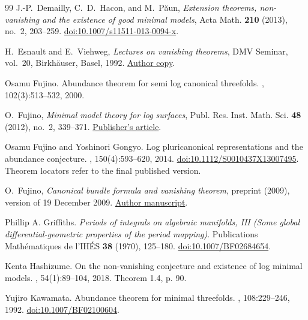 \begin{thebibliography}{99}
J.-P.~Demailly, C.~D.~Hacon, and M.~P\u{a}un,
\emph{Extension theorems, non-vanishing and the existence of good minimal models},
Acta Math. \textbf{210} (2013), no.~2, 203--259.
\href{https://doi.org/10.1007/s11511-013-0094-x}{doi:10.1007/s11511-013-0094-x}.

H.~Esnault and E.~Viehweg,
\emph{Lectures on vanishing theorems}, DMV Seminar, vol.~20,
Birkh\"auser, Basel, 1992.
\href{https://page.mi.fu-berlin.de/esnault/books/esvibuch.pdf}{Author copy}.

Osamu Fujino.
\newblock Abundance theorem for semi log canonical threefolds.
, 102(3):513--532, 2000.

O.~Fujino,
\emph{Minimal model theory for log surfaces},
Publ. Res. Inst. Math. Sci. \textbf{48} (2012), no.~2, 339--371.
\href{https://ems.press/journals/prims/articles/11294}{Publisher's article}.

Osamu Fujino and Yoshinori Gongyo.
\newblock Log pluricanonical representations and the abundance conjecture.
, 150(4):593--620, 2014.
\newblock \href{https://doi.org/10.1112/S0010437X13007495}{doi:10.1112/S0010437X13007495}.
\newblock Theorem locators refer to the final published version.

O.~Fujino,
\emph{Canonical bundle formula and vanishing theorem},
preprint (2009), version of 19 December 2009.
\href{https://www.math.kyoto-u.ac.jp/~fujino/cano-vani-bessatsu2.pdf}{Author manuscript}.

Phillip A. Griffiths.
\newblock \emph{Periods of integrals on algebraic manifolds, {III} (Some global differential-geometric properties of the period mapping)}.
\newblock Publications Math\'ematiques de l'IH\'ES \textbf{38} (1970), 125--180.
\newblock \href{https://doi.org/10.1007/BF02684654}{doi:10.1007/BF02684654}.

Kenta Hashizume.
\newblock On the non-vanishing conjecture and existence of log minimal models.
, 54(1):89--104, 2018.
\newblock Theorem 1.4, p. 90.

Yujiro Kawamata.
\newblock Abundance theorem for minimal threefolds.
, 108:229--246, 1992.
\newblock \href{https://doi.org/10.1007/BF02100604}{doi:10.1007/BF02100604}.


\end{thebibliography}
